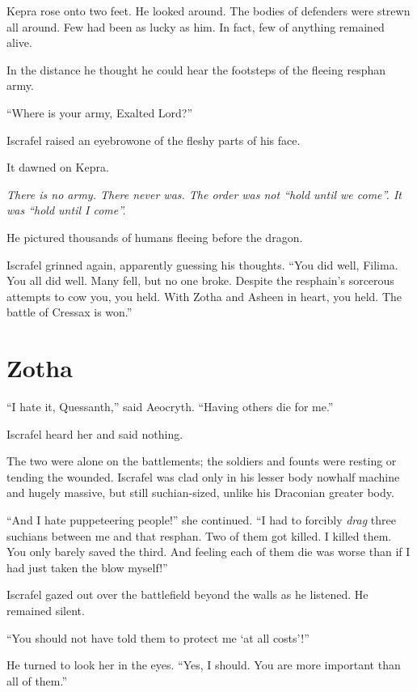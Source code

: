 \documentclass
  [a4paper,
   12pt,
   oneside
  ]%
  {article}
\begin{document}
Kepra rose onto two feet. He looked around. 
The bodies of defenders were strewn all around. 
Few had been as lucky as him. 
In fact, few of anything remained alive. 

In the distance he thought he could hear the footsteps of the fleeing resphan army. 

``Where is your army, Exalted Lord?''

Iscrafel raised an eyebrow\dash{}one of the fleshy parts of his face.

It dawned on Kepra. 

\emph{%
    There is no army. There never was. The order was not ``hold until we come''. It was ``hold until I come''.%
}

He pictured thousands of humans fleeing before the dragon.

Iscrafel grinned again, apparently guessing his thoughts. 
``You did well, Filima. You all did well. Many fell, but no one broke. Despite the resphain's sorcerous attempts to cow you, you held. With Zotha and Asheen in heart, you held. The battle of Cressax is won.''



\section{Zotha}
``I hate it, Quessanth,'' said Aeocryth. ``Having others die for me.''

Iscrafel heard her and said nothing. 

The two were alone on the battlements; the soldiers and founts were resting or tending the wounded.
Iscrafel was clad only in his lesser body now\dash{}half machine and hugely massive, but still suchian-sized, unlike his Draconian greater body. 

``And I hate puppeteering people!'' she continued. 
``I had to forcibly \emph{drag} three suchians between me and that resphan. Two of them got killed. I killed them. You only barely saved the third. And feeling each of them die was worse than if I had just taken the blow myself!''

Iscrafel gazed out over the battlefield beyond the walls as he listened. 
He remained silent. 

``You should not have told them to protect me `at all costs'!''

He turned to look her in the eyes.
``Yes, I should. You are more important than all of them.''
\end{document}
